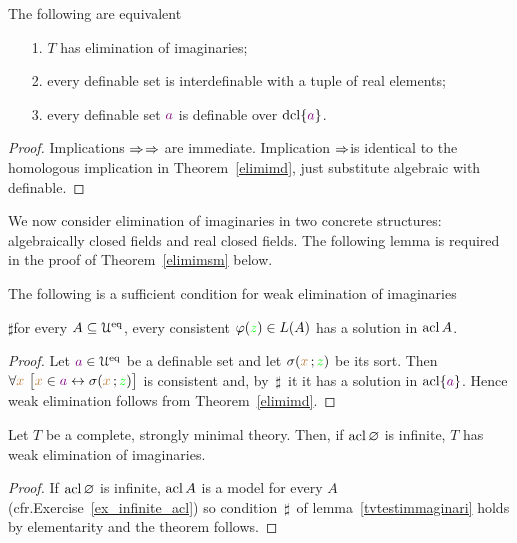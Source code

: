\documentclass[creche.tex]{subfiles}
\begin{document}
\begin{theorem}\label{elimimf} 
The following are equivalent
\begin{itemize}
\item[1.] $T$ has elimination of imaginaries;
\item[2.] every definable set is interdefinable with a tuple of real elements;
\item[3.] every definable set ${\color{violet} a}$ is definable over $\mathop{\rm dcl}\{{\color{violet} a}\}$.
\end{itemize}
\end{theorem}

\begin{proof}
Implications $\Rightarrow$$\Rightarrow$ are immediate. Implication $\Rightarrow$is identical to the homologous implication in Theorem~\ref{elimimd}, just substitute algebraic with definable.
\end{proof}

We now consider elimination of imaginaries in two concrete structures: algebraically closed fields and real closed fields. The following lemma is required in the proof of Theorem~\ref{elimimsm} below.

\begin{lemma}\label{tvtestimmaginari} 
The following is a sufficient condition for weak elimination of imaginaries

$\sharp$\qquad for every $A\subseteq\EuScript U^{{\rm eq}}$, every consistent $\varphi({\color{green} z})\in L(A)$ has a solution in $\mathop{\rm acl} A$.
\end{lemma}

\begin{proof}
Let ${\color{violet} a}\in\EuScript U^{{\rm eq}}$ be a definable set and let $\sigma({\color{brown} x}\,;{\color{green} z})$ be its sort. Then $\forall{\color{brown}x}\ \big[{\color{brown} x}\in{\color{violet}a}\leftrightarrow\sigma({\color{brown} x}\,;{\color{green} z})\big]$ is consistent and, by $\,\sharp\,$ it  it has a solution in $\mathop{\rm acl}\{{\color{violet} a}\}$. Hence weak elimination follows from Theorem~\ref{elimimd}.
\end{proof}

\begin{theorem}\label{elimimsm} 
Let $T$ be a complete, strongly minimal theory. Then, if $\mathop{\rm acl}\varnothing$ is infinite, $T$ has weak elimination of imaginaries.
\end{theorem}

\begin{proof}
If $\mathop{\rm acl}\varnothing$ is infinite, $\mathop{\rm acl} A$ is a model for every $A$ (cfr.\@ Exercise~\ref{ex_infinite_acl}) so condition $\,\sharp\,$ of lemma~\ref{tvtestimmaginari} holds by elementarity and the theorem follows.
\end{proof}
\end{document}
